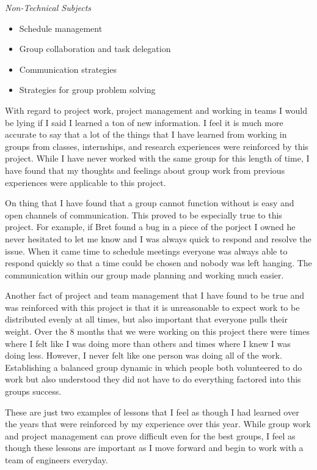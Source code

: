 \documentclass[10pt, onecolumn, draftclsnofoot, letterpaper, compsoc]{IEEEtran}
\begin{document}
\noindent \textit{Non-Technical Subjects}
\begin{itemize}
	\item Schedule management
	\item Group collaboration and task delegation
    \item Communication strategies
    \item Strategies for group problem solving \\
\end{itemize}

With regard to project work, project management and working in teams I would be
lying if I said I learned a ton of new information. I feel it is much more accurate
to say that a lot of the things that I have learned from working in groups from
classes, internships, and research experiences were reinforced by this project. While I have never
worked with the same group for this length of time, I have found that my thoughts
and feelings about group work from previous experiences were applicable to this
project.

On thing that I have found that a group cannot function without is easy and open
channels of communication. This proved to be especially true to this project. For
example, if Bret found a bug in a piece of the porject I owned he never hesitated
to let me know and I was always quick to respond and resolve the issue. When it
came time to schedule meetings everyone was always able to respond quickly so that
a time could be chosen and nobody was left hanging. The communication within our
group made planning and working much easier.

Another fact of project and team management that I have found to be true and was reinforced
with this project is that it is unreasonable to expect work to be distributed
evenly at all times, but also important that everyone pulls their weight. Over the
8 months that we were working on this project there were times where I felt like
I was doing more than others and times where I knew I was doing less. However, I
never felt like one person was doing all of the work. Establishing a balanced group
dynamic in which people both volunteered to do work but also understood they did
not have to do everything factored into this groups success.

These are just two examples of lessons that I feel as though I had learned over the
years that were reinforced by my experience over this year. While group work and
project management can prove difficult even for the best groups, I feel as though
these lessons are important as I move forward and begin to work with a team of
engineers everyday.
\end{document}
